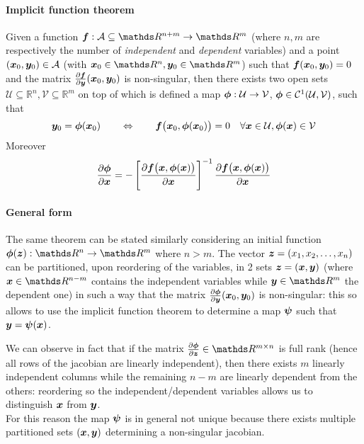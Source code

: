 	\paragraph{Implicit function theorem} Given a function $\vett f : \mathcal A \subseteq \mathds R^{n+m} \rightarrow \mathds R^m$ (where $n,m$ are respectively the number of \textit{independent} and \textit{dependent} variables) and a point $(\boldsymbol{x}_0,\boldsymbol{y}_0) \in \mathcal A$ (with $\vett x_0 \in \mathds R^n,\vett y_0\in \mathds R^m$) such that $\boldsymbol{f}(\boldsymbol{x}_0,\boldsymbol{y}_0) = 0$ and the matrix $\frac{\partial \boldsymbol{f}}{\partial \boldsymbol{y}}(\boldsymbol{x}_0,\boldsymbol{y}_0)$ is non-singular, then there exists two open sets $\mathcal U \subseteq \mathds R^n,\mathcal V \subseteq \mathds R^m$ on top of which is defined a map $\boldsymbol{\phi}: \mathcal U \rightarrow \mathcal V$, $\boldsymbol{\phi} \in \mathcal C^1(\mathcal U,\mathcal V)$, such that
	\[ \boldsymbol{y}_0 = \boldsymbol{\phi}(\boldsymbol{x}_0) \qquad \Leftrightarrow \qquad \boldsymbol{f}\big(\boldsymbol{x}_0, \boldsymbol{\phi} (\boldsymbol{x}_0)\big) = 0 \quad \forall \boldsymbol{x} \in \mathcal U, \boldsymbol{\phi}(\boldsymbol{x}) \in \mathcal V \]
	Moreover
	\begin{equation}
		\frac{\partial \boldsymbol{\phi}}{\partial \boldsymbol{x}} = - \left[ \frac{\partial \boldsymbol{f}\big(\boldsymbol{x},\boldsymbol{\phi}(\boldsymbol{x})\big)}{\partial \boldsymbol{x}} \right]^{-1} \frac{\partial \boldsymbol{f}\big(\boldsymbol{x},\boldsymbol{\phi}(\boldsymbol{x})\big)}{\partial \boldsymbol{x}}
	\end{equation}
	
	\paragraph{General form} The same theorem can be stated similarly considering an initial function $\vett \phi(\vett z): \mathds R^n \rightarrow \mathds R^m$ where $n>m$. The vector $\boldsymbol{z} = (x_1, x_2,\dots, x_n)$ can be partitioned, upon reordering of the variables, in 2 sets $\boldsymbol{z} = (\boldsymbol{x}, \boldsymbol{y})$ (where $\vett x \in \mathds R^{n-m}$ contains the independent variables while $\vett y \in \mathds R^m$ the dependent one) in such a way that the matrix $\frac{\partial \boldsymbol{\phi}}{\partial \boldsymbol{y}}(\boldsymbol{x}_0,\boldsymbol{y}_0)$ is non-singular: this so allows to use the implicit function theorem to determine a map $\boldsymbol{\psi}$ such that $\boldsymbol{y} = \boldsymbol{\psi}(\boldsymbol{x})$.
	
	We can observe in fact that if the matrix $\pd{\vett \phi}{\vett z} \in \mathds R^{m\times n}$ is full rank (hence all rows of the jacobian are linearly independent), then there exists $m$ linearly independent columns while the remaining $n-m$ are linearly dependent from the others: reordering so the independent/dependent variables allows us to distinguish $\boldsymbol{x}$ from $\boldsymbol{y}$. \\
	For this reason the map $\boldsymbol{\psi}$ is in general not unique because there exists multiple partitioned sets $(\boldsymbol{x},\boldsymbol{y})$ determining a non-singular jacobian.
	
